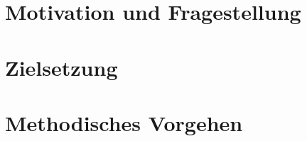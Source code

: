 \onehalfspacing

\section{Motivation und Fragestellung}

\section{Zielsetzung}

\section{Methodisches Vorgehen}